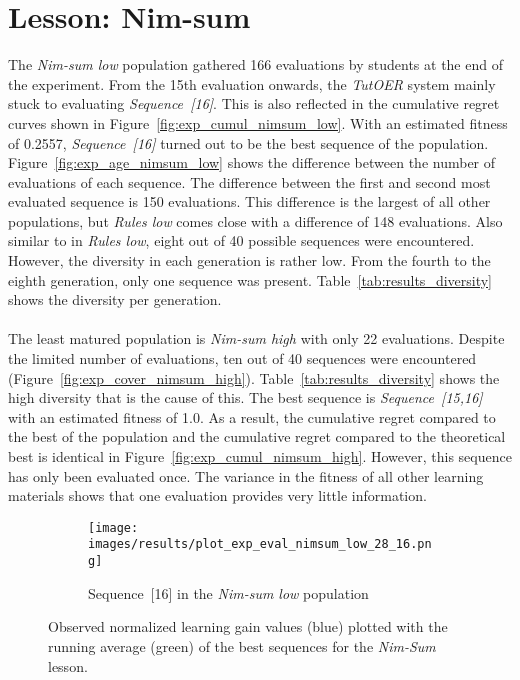 \section{Lesson: Nim-sum}
\label{sec:results_nimsum}
The \emph{Nim-sum low} population gathered 166 evaluations by students at the
end of the experiment. From the 15th evaluation onwards, the \emph{TutOER}
system mainly stuck to evaluating \emph{Sequence~[16]}. This is also reflected
in the cumulative regret curves shown in Figure~\ref{fig:exp_cumul_nimsum_low}.
With an estimated fitness of 0.2557, \emph{Sequence~[16]} turned out to be the
best sequence of the population. Figure~\ref{fig:exp_age_nimsum_low} shows the
difference between the number of evaluations of each sequence. The difference
between the first and second most evaluated sequence is 150 evaluations. This
difference is the largest of all other populations, but \emph{Rules low} comes
close with a difference of 148 evaluations. Also similar to in \emph{Rules
low}, eight out of 40 possible sequences were encountered. However, the
diversity in each generation is rather low. From the fourth to the eighth
generation, only one sequence was present. Table~\ref{tab:results_diversity}
shows the diversity per generation.\\\\
\noindent
The least matured population is \emph{Nim-sum high} with only 22 evaluations.
Despite the limited number of evaluations, ten out of 40 sequences were
encountered (Figure~\ref{fig:exp_cover_nimsum_high}).
Table~\ref{tab:results_diversity} shows the high diversity that is the cause of
this. The best sequence is \emph{Sequence~[15,16]} with an estimated fitness of
1.0. As a result, the cumulative regret compared to the best of the population
and the cumulative regret compared to the theoretical best is identical in
Figure~\ref{fig:exp_cumul_nimsum_high}. However, this sequence has only been
evaluated once. The variance in the fitness of all other learning materials
shows that one evaluation provides very little information.

\begin{figure}[ht]
	\begin{subfigure}{0.9\linewidth}
	\centering
	\texttt{[image: images/results/plot\_exp\_eval\_nimsum\_low\_28\_16.png]}
	\caption{Sequence~[16] in the \emph{Nim-sum low} population}
	\label{fig:exp_eval_nimsum_low_28}
	\end{subfigure}
	\caption[Evaluations of the best sequences in Nim-sum]{Observed normalized learning gain values (blue) plotted with the
		running average (green) of the best sequences for the \emph{Nim-Sum}
	lesson.}
	\label{fig:exp_eval_nimsum}
\end{figure}

